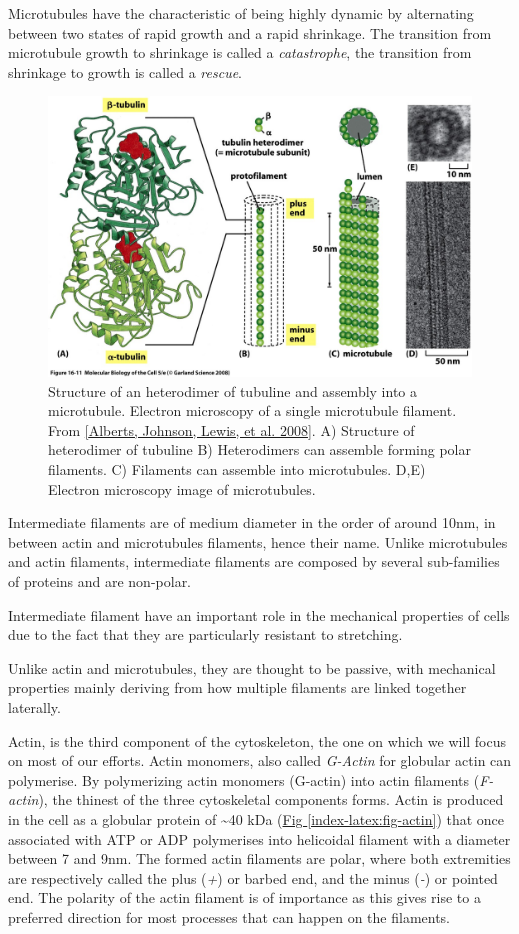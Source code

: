 \documentclass[A4paperpaper,11pt,english]{sphinxmanual}
\begin{document}
Microtubules have the characteristic of being highly dynamic by alternating
between two states of rapid growth and a rapid shrinkage. The transition from
microtubule growth to shrinkage is called a \emph{catastrophe}, the transition from
shrinkage to growth is called a \emph{rescue}.
\begin{figure}[htbp]
\centering
\capstart

\includegraphics[width=0.700\linewidth]{microtubules-structure.jpg}
\caption{Structure of an heterodimer of tubuline and assembly into a microtubule.
Electron microscopy of a single microtubule filament. From {\hyperref[index-latex:alberts2008]{{[}Alberts, Johnson, Lewis,  et al.  2008{]}}}.
A) Structure of heterodimer of tubuline B)
Heterodimers can assemble forming polar filaments. C) Filaments can
assemble into  microtubules. D,E) Electron microscopy image of
microtubules.}\label{index-latex:fig-mt}\end{figure}

Intermediate filaments are of medium diameter in the order of around 10nm, in
between actin and microtubules filaments, hence their name.  Unlike microtubules
and actin filaments, intermediate filaments are composed by several sub-families
of proteins and are non-polar.

Intermediate filament have an important role in the mechanical properties of
cells due to the fact that they are particularly  resistant to stretching.

Unlike actin and microtubules, they are thought to be passive, with mechanical
properties mainly deriving from how multiple filaments are linked together
laterally.

Actin, is the third component of the cytoskeleton, the one on which  we will
focus on most of our efforts. Actin monomers, also called \emph{G-Actin} for globular actin can polymerise.
By polymerizing actin monomers (G-actin) into actin filaments (\emph{F-actin}), the
thinest of the three cytoskeletal components forms. Actin is produced in the
cell as a globular protein of \textasciitilde{}40 kDa (\hyperref[index-latex:fig-actin]{Fig  \ref*{index-latex:fig-actin}}) that once associated with ATP or ADP
polymerises into helicoidal filament with a diameter between 7 and 9nm. The
formed actin filaments are polar, where both extremities are respectively called the
plus (\emph{+}) or barbed end, and the minus (\emph{-}) or pointed end. The polarity of
the actin filament is of importance as this gives rise to a preferred direction
for most processes that can happen on the filaments.
\end{document}
